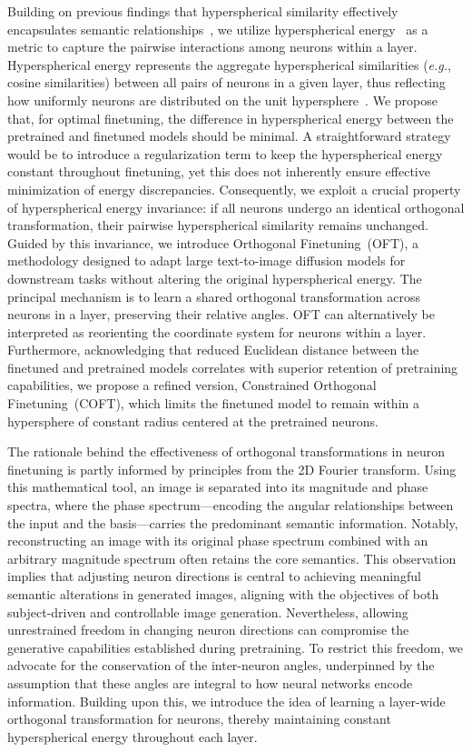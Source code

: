 Building on previous findings that hyperspherical similarity effectively encapsulates semantic relationships~\cite{liu2017deep,liu2018decoupled,chen2020angular}, we utilize hyperspherical energy~\cite{liu2018learning} as a metric to capture the pairwise interactions among neurons within a layer. Hyperspherical energy represents the aggregate hyperspherical similarities (\emph{e.g.}, cosine similarities) between all pairs of neurons in a given layer, thus reflecting how uniformly neurons are distributed on the unit hypersphere~\cite{liu2021learning}. We propose that, for optimal finetuning, the difference in hyperspherical energy between the pretrained and finetuned models should be minimal. A straightforward strategy would be to introduce a regularization term to keep the hyperspherical energy constant throughout finetuning, yet this does not inherently ensure effective minimization of energy discrepancies. Consequently, we exploit a crucial property of hyperspherical energy invariance: if all neurons undergo an identical orthogonal transformation, their pairwise hyperspherical similarity remains unchanged. Guided by this invariance, we introduce Orthogonal Finetuning~(OFT), a methodology designed to adapt large text-to-image diffusion models for downstream tasks without altering the original hyperspherical energy. The principal mechanism is to learn a shared orthogonal transformation across neurons in a layer, preserving their relative angles. OFT can alternatively be interpreted as reorienting the coordinate system for neurons within a layer. Furthermore, acknowledging that reduced Euclidean distance between the finetuned and pretrained models correlates with superior retention of pretraining capabilities, we propose a refined version, Constrained Orthogonal Finetuning~(COFT), which limits the finetuned model to remain within a hypersphere of constant radius centered at the pretrained neurons.

The rationale behind the effectiveness of orthogonal transformations in neuron finetuning is partly informed by principles from the 2D Fourier transform. Using this mathematical tool, an image is separated into its magnitude and phase spectra, where the phase spectrum—encoding the angular relationships between the input and the basis—carries the predominant semantic information. Notably, reconstructing an image with its original phase spectrum combined with an arbitrary magnitude spectrum often retains the core semantics. This observation implies that adjusting neuron directions is central to achieving meaningful semantic alterations in generated images, aligning with the objectives of both subject-driven and controllable image generation. Nevertheless, allowing unrestrained freedom in changing neuron directions can compromise the generative capabilities established during pretraining. To restrict this freedom, we advocate for the conservation of the inter-neuron angles, underpinned by the assumption that these angles are integral to how neural networks encode information. Building upon this, we introduce the idea of learning a layer-wide orthogonal transformation for neurons, thereby maintaining constant hyperspherical energy throughout each layer.

